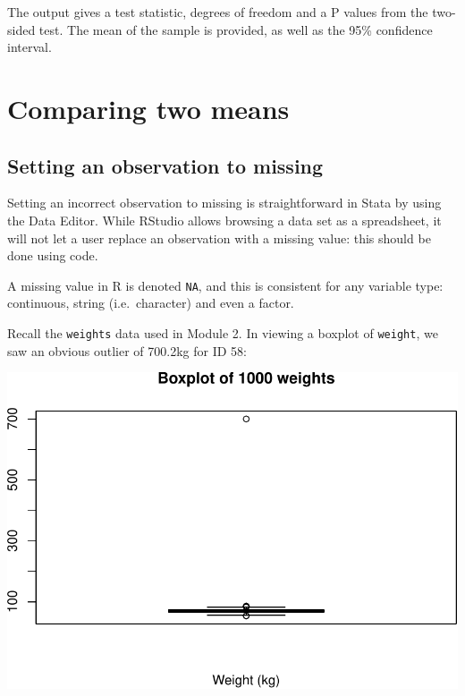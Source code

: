 \documentclass[
]{memoir}
\newenvironment{Shaded}{\begin{snugshade}}{\end{snugshade}}
\newcommand{\AttributeTok}[1]{\textcolor[rgb]{0.77,0.63,0.00}{#1}}
\newcommand{\FunctionTok}[1]{\textcolor[rgb]{0.00,0.00,0.00}{#1}}
\newcommand{\NormalTok}[1]{#1}
\newcommand{\OtherTok}[1]{\textcolor[rgb]{0.56,0.35,0.01}{#1}}
\newcommand{\SpecialCharTok}[1]{\textcolor[rgb]{0.00,0.00,0.00}{#1}}
\newcommand{\StringTok}[1]{\textcolor[rgb]{0.31,0.60,0.02}{#1}}
\begin{document}
The output gives a test statistic, degrees of freedom and a P values from the two-sided test. The mean of the sample is provided, as well as the 95\% confidence interval.

\hypertarget{comparing-two-means}{%
\chapter{Comparing two means}\label{comparing-two-means}}

\hypertarget{setting-an-observation-to-missing}{%
\section{Setting an observation to missing}\label{setting-an-observation-to-missing}}

Setting an incorrect observation to missing is straightforward in Stata by using the Data Editor. While RStudio allows browsing a data set as a spreadsheet, it will not let a user replace an observation with a missing value: this should be done using code.

A missing value in R is denoted \texttt{NA}, and this is consistent for any variable type: continuous, string (i.e.~character) and even a factor.

Recall the \texttt{weights} data used in Module 2. In viewing a boxplot of \texttt{weight}, we saw an obvious outlier of 700.2kg for ID 58:

\begin{Shaded}
\end{Shaded}

\includegraphics{phcm9795-R-notes_files/figure-latex/unnamed-chunk-85-1.pdf}
\end{document}

